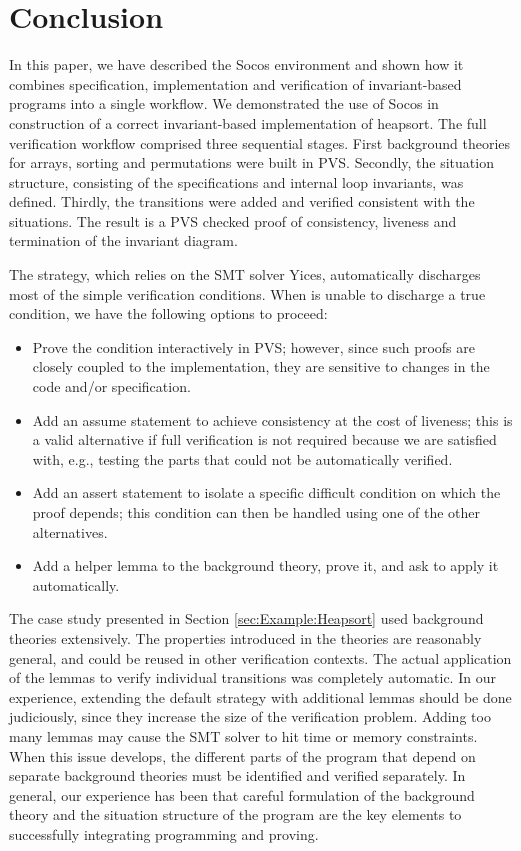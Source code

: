 \documentclass[english,submission]{eptcs}
\begin{document}
\section{Conclusion\label{sec:Conclusion}}

In this paper, we have described the Socos environment and shown how
it combines specification, implementation and verification of
invariant-based programs into a single workflow. We demonstrated the
use of Socos in construction of a correct invariant-based
implementation of heapsort.  The full verification workflow comprised
three sequential stages.  First background theories for arrays,
sorting and permutations were built in PVS. Secondly, the situation
structure, consisting of the specifications and internal loop
invariants, was defined. Thirdly, the transitions were added and
verified consistent with the situations. The result is a PVS checked
proof of consistency, liveness and termination of the invariant
diagram.

The  strategy, which relies on the SMT solver Yices,
automatically discharges most of the simple verification conditions.
When  is unable to discharge a true condition,
we have the following options to proceed: 
\begin{itemize}
\item Prove the condition interactively in PVS; however, since such
  proofs are closely coupled to the implementation, they are sensitive
  to changes in the code and/or specification.
\item Add an assume statement to achieve consistency at the cost of
  liveness;  this is a valid alternative if full verification is not
  required because we are satisfied with, e.g., testing the parts that
  could not be automatically verified.
\item Add an assert statement to isolate a specific difficult
  condition on which the proof depends; this condition can then be
  handled using one of the other alternatives.
\item Add a helper lemma to the background theory, prove it, and ask
   to apply it automatically.
\end{itemize}
The case study presented in Section \ref{sec:Example:Heapsort} used
background theories extensively. The properties introduced in the
theories are reasonably general, and could be reused in other
verification contexts. The actual application of the lemmas to verify
individual transitions was completely automatic. In our experience,
extending the default strategy with additional lemmas should be done
judiciously, since they increase the size of the verification problem.
Adding too many lemmas may cause the SMT solver to hit time or memory
constraints. When this issue develops, the different parts of the
program that depend on separate background theories must be identified
and verified separately.  In general, our experience has been that
careful formulation of the background theory and the situation
structure of the program are the key elements to successfully
integrating programming and proving.

\begin{small}
 

\end{small}
\end{document}

